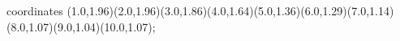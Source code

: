 					coordinates { (1.0,1.96)(2.0,1.96)(3.0,1.86)(4.0,1.64)(5.0,1.36)(6.0,1.29)(7.0,1.14)(8.0,1.07)(9.0,1.04)(10.0,1.07)};